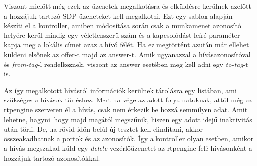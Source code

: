 Viszont mielőtt még ezek az üzenetek megalkotásra és elküldésre kerülnek azelőtt
a hozzájuk tartozó SDP üzeneteket kell megalkotni. Ezt egy sablon alapján készíti el 
a kontroller, amiben módosítása során csak a munkamenet azonosító helyére kerül
mindig egy véletlenszerű szám és a kapcsolódást leíró paraméter kapja meg a lokális 
címet azaz a hívó félét. Ha ez megtörtént azután már ellehet küldeni elsőnek az offer-t
majd az answer-t. Amik ugyanazzal a hívásazonosítóval és \textit{from-tag}-l rendelkeznek,
viszont az answer esetében meg kell adni egy \textit{to-tag}-t is.

Az így megalkotott hívásról információk kerülnek tárolásra egy listában, ami szükséges
a hívások törléshez. Mert ha vége az adott folyamatoknak, attól még az rtpengine szerveren
él a hívás, csak nem érkezik be hozzá semmilyen adat. Amit lehetne, hagyni, hogy majd 
magától megszűnik, hiszen egy adott idejű inaktivitás után törli. De, ha rövid időn 
belül új tesztet kell elindítani, akkor összeakadhatnak a portok és az azonosítók. Így a 
kontroller olyan esetben, amikor a hívás megszakad küld egy \textit{delete} vezérlőüzenetet
az rtpengine felé hívásonként a hozzájuk tartozó azonosítókkal.

